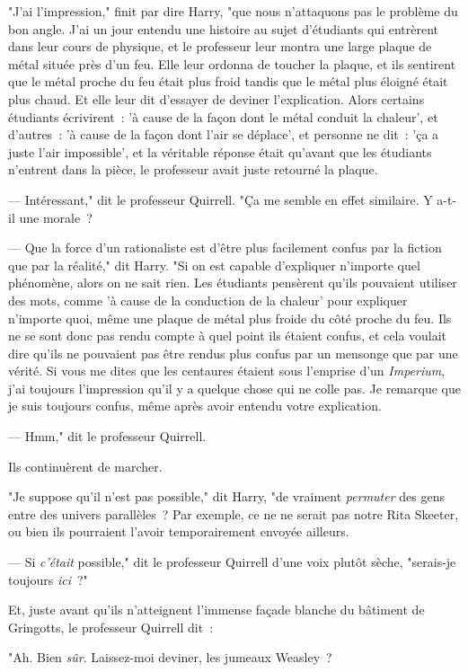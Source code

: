 "J'ai l'impression," finit par dire Harry, "que nous n'attaquons pas le problème du bon angle. J'ai un jour entendu une histoire au sujet d'étudiants qui entrèrent dans leur cours de physique, et le professeur leur montra une large plaque de métal située près d'un feu. Elle leur ordonna de toucher la plaque, et ils sentirent que le métal proche du feu était plus froid tandis que le métal plus éloigné était plus chaud. Et elle leur dit d'essayer de deviner l'explication. Alors certains étudiants écrivirent~: 'à cause de la façon dont le métal conduit la chaleur', et d'autres~: 'à cause de la façon dont l'air se déplace', et personne ne dit~: 'ça a juste l'air impossible', et la véritable réponse était qu'avant que les étudiants n'entrent dans la pièce, le professeur avait juste retourné la plaque.

--- Intéressant," dit le professeur Quirrell. "Ça me semble en effet similaire. Y a-t-il une morale~?

--- Que la force d'un rationaliste est d'être plus facilement confus par la fiction que par la réalité," dit Harry. "Si on est capable d'expliquer n'importe quel phénomène, alors on ne sait rien. Les étudiants pensèrent qu'ils pouvaient utiliser des mots, comme 'à cause de la conduction de la chaleur' pour expliquer n'importe quoi, même une plaque de métal plus froide du côté proche du feu. Ils ne se sont donc pas rendu compte à quel point ils étaient confus, et cela voulait dire qu'ils ne pouvaient pas être rendus plus confus par un mensonge que par une vérité. Si vous me dites que les centaures étaient sous l'emprise d'un \emph{Imperium}, j'ai toujours l'impression qu'il y a quelque chose qui ne colle pas. Je remarque que je suis toujours confus, même après avoir entendu votre explication.

--- Hmm," dit le professeur Quirrell.

Ils continuèrent de marcher.

"Je suppose qu'il n'est pas possible," dit Harry, "de vraiment \emph{permuter} des gens entre des univers parallèles~? Par exemple, ce ne ne serait pas notre Rita Skeeter, ou bien ils pourraient l'avoir temporairement envoyée ailleurs.

--- Si \emph{c'était} possible," dit le professeur Quirrell d'une voix plutôt sèche, "serais-je toujours \emph{ici}~?"

Et, juste avant qu'ils n'atteignent l'immense façade blanche du bâtiment de Gringotts, le professeur Quirrell dit~:

"Ah. Bien \emph{sûr}. Laissez-moi deviner, les jumeaux Weasley~?

